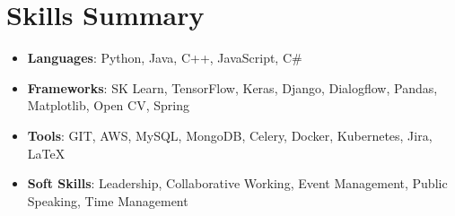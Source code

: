 \documentclass[a4paper,20pt]{article}
\newcommand{\resumeItem}[2]{
	\item\small{
		\textbf{#1}{: #2 \vspace{-2pt}}
	}
}
\newcommand{\resumeSubItem}[2]{\resumeItem{#1}{#2}\vspace{-3pt}}
\newcommand{\resumeSubHeadingListStart}{\begin{itemize}[leftmargin=*]}
\newcommand{\resumeSubHeadingListEnd}{\end{itemize}}
\begin{document}
	\section{Skills Summary}
	\resumeSubHeadingListStart
	\resumeSubItem{Languages}{\hspace{0.5cm}Python, Java, C++, JavaScript, C\#}
	\resumeSubItem{Frameworks}{\hspace{0.2cm}SK Learn, TensorFlow, Keras, Django, Dialogflow, Pandas, Matplotlib, Open CV, Spring}
	\resumeSubItem{Tools}{\hspace{1.3cm}GIT, AWS, MySQL, MongoDB, Celery, Docker, Kubernetes, Jira, LaTeX}
	\resumeSubItem{Soft Skills}{\hspace{0.56cm}Leadership, Collaborative Working, Event Management, Public Speaking, Time Management}
	
	\resumeSubHeadingListEnd
	\vspace{7pt}
	
	
	
	
		
\end{document}
